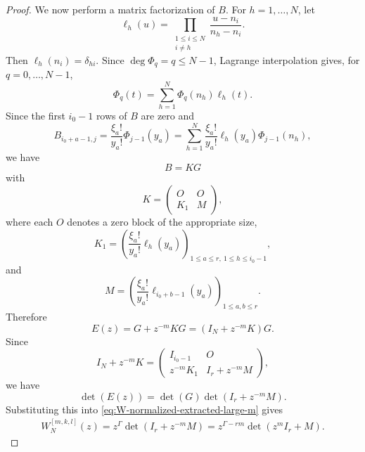\documentclass[preprint,3p,10pt]{elsarticle}
\theoremstyle{definition}
\begin{document}
\begin{proof}
We now perform a matrix factorization of \(B\). 
For \(h=1,\ldots,N\), let
\begin{equation}
    \ell_h(u)
    =
    \prod_{\substack{1\le i\le N\\ i\neq h}}
    \frac{u-n_i}{n_h-n_i}.
    \label{eq:lagrange-basis-large-m}
\end{equation}
Then \(\ell_h(n_i)=\delta_{hi}\). Since \(\deg\Phi_q=q\le N-1\), Lagrange
interpolation gives, for \(q=0,\ldots,N-1\),
\begin{equation}
    \Phi_q(t)
    =
    \sum_{h=1}^{N}\Phi_q(n_h)\ell_h(t).
    \label{eq:falling-factorial-interpolation-large-m}
\end{equation}
Since the first $i_0-1$ rows of $B$ are zero and
\begin{equation}
    B_{i_0+a-1,j}=\frac{\xi_a!}{y_a!}\Phi_{j-1}(y_a)=
    \sum_{h=1}^{N}
    \frac{\xi_a!}{y_a!}\ell_h(y_a)\Phi_{j-1}(n_h),
\end{equation}
we have
\begin{equation*}
    B=KG
\end{equation*}
with
\begin{equation}
    K=
    \begin{pmatrix}
    O & O\\
    K_1&M
    \end{pmatrix},
    \label{eq:K-block-form-large-m}
\end{equation}
where each \(O\) denotes a zero block of the appropriate size,
\begin{equation}
    K_1=
    \left(
    \frac{\xi_a!}{y_a!}\ell_h(y_a)
    \right)_{1\le a\le r,\ 1\le h\le i_0-1},
\end{equation}
and
\begin{equation}
    M
    =\left(
    \frac{\xi_a!}{y_a!}\ell_{i_0+b-1}(y_a)\right)_{1\le a,b\le r}.
    \label{eq:M-active-block-large-m}
\end{equation}
Therefore
\begin{equation}
    E(z)=G+z^{-m}KG=(I_N+z^{-m}K)G.
    \label{eq:E-KG-factorization-large-m}
\end{equation}
Since
\begin{equation}
    I_N+z^{-m}K
    =
    \begin{pmatrix}
    I_{i_0-1}&O\\
    z^{-m}K_1&I_r+z^{-m}M
    \end{pmatrix},
\end{equation}
we have
\begin{equation}
    \det\left(E(z)\right)
    =
    \det\left(G\right)\det\left(I_r+z^{-m}M\right).
\end{equation}
Substituting this into \eqref{eq:W-normalized-extracted-large-m} gives
\begin{align}
    W_N^{[m,k,l]}(z)
    =
    z^\Gamma\det(I_r+z^{-m}M) =
    z^{\Gamma-rm}\det(z^mI_r+M).
    \label{eq:W-reduction-large-m}
\end{align}



\end{proof}
\end{document}
